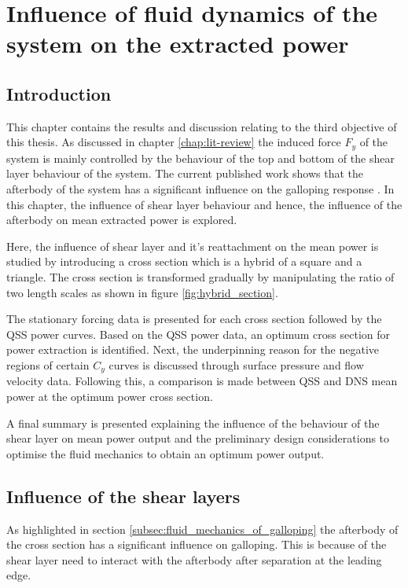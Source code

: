 \chapter{Influence of fluid dynamics of the system on the extracted power}

\section{Introduction}

This chapter contains the results and discussion relating to the third objective of this thesis. As discussed in chapter \ref{chap:lit-review} the induced force $F_y$ of the system is mainly controlled by the behaviour of the top and bottom of the shear layer behaviour of the system. The current published work shows that the afterbody of the system has a significant influence on the galloping response \citep{Luo1994}. In this chapter, the influence of shear layer behaviour and hence, the influence of the afterbody on mean extracted power is explored.

Here, the influence of shear layer and it's reattachment on the mean power is studied by introducing a cross section which is a hybrid of a square and a triangle. The cross section is transformed gradually by manipulating the ratio of two length scales as shown in figure \ref{fig:hybrid_section}.

The stationary forcing data is presented for each cross section followed by the QSS power curves. Based on the QSS power data, an optimum cross section for power extraction is identified. Next, the underpinning reason for the negative regions of certain $C_y$ curves is discussed through surface pressure and flow velocity data. Following this, a comparison is made between QSS and DNS mean power at the optimum power cross section.       

A final summary is presented explaining the influence of the behaviour of the shear layer on mean power output and the preliminary design considerations to optimise the fluid mechanics to obtain an optimum power output. 


\section{Influence of the shear layers}

As highlighted in section \ref{subsec:fluid_mechanics_of_galloping} the afterbody of the cross section has a significant influence on galloping. This is because of the shear layer need to interact with the afterbody after separation at the leading edge. 


